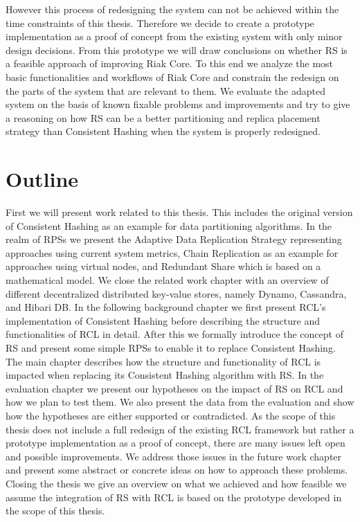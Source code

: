 However this process of redesigning the system can not be achieved within the time constraints of this thesis.
Therefore we decide to create a prototype implementation as a proof of concept from the existing system with only minor design decisions.
From this prototype we will draw conclusions on whether \ac{RS} is a feasible approach of improving Riak Core.
To this end we analyze the most basic functionalities and workflows of Riak Core and constrain the redesign on the parts of the system that are relevant to them.
We evaluate the adapted system on the basis of known fixable problems and improvements and try to give a reasoning on how \ac{RS} can be a better partitioning and replica placement strategy than Consistent Hashing when the system is properly redesigned.

\section{Outline}
First we will present work related to this thesis.
This includes the original version of Consistent Hashing\cite{Karger1997} as an example for data partitioning algorithms.
In the realm of \acp{RPS} we present the Adaptive Data Replication Strategy\cite{Mansouri2016} representing approaches using current system metrics, Chain Replication\cite{Renesse2004} as an example for approaches using virtual nodes, and Redundant Share\cite{Brinkmann2007} which is based on a mathematical model.
We close the related work chapter with an overview of different decentralized distributed key-value stores, namely Dynamo\cite{DeCandia2007}, Cassandra\cite{Cassandra2016}, and Hibari DB\cite{Hibari2015}.
In the following background chapter we first present \ac{RCL}'s implementation of Consistent Hashing before describing the structure and functionalities of \ac{RCL} in detail.
After this we formally introduce the concept of \ac{RS} and present some simple \acp{RPS} to enable it to replace Consistent Hashing.
The main chapter describes how the structure and functionality of \ac{RCL} is impacted when replacing its Consistent Hashing algorithm with \ac{RS}.
In the evaluation chapter we present our hypotheses on the impact of \ac{RS} on \ac{RCL} and how we plan to test them.
We also present the data from the evaluation and show how the hypotheses are either supported or contradicted.
As the scope of this thesis does not include a full redesign of the existing \ac{RCL} framework but rather a prototype implementation as a proof of concept, there are many issues left open and possible improvements.
We address those issues in the future work chapter and present some abstract or concrete ideas on how to approach these problems.
Closing the thesis we give an overview on what we achieved and how feasible we assume the integration of \ac{RS} with \ac{RCL} is based on the prototype developed in the scope of this thesis.